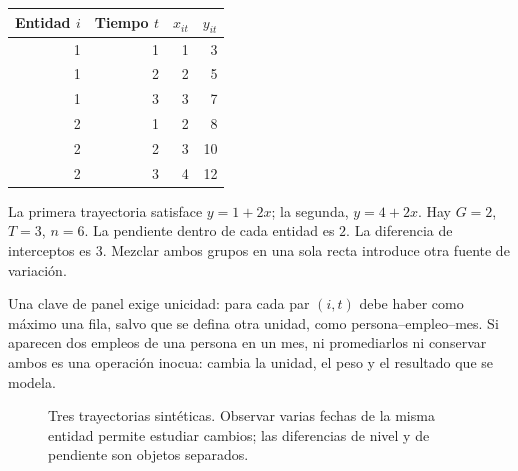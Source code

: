 \documentclass[11pt,a4paper]{article}
\theoremstyle{definition}
\begin{document}
\begin{ejemplo}
\begin{center}
\begin{tabular}{rrrr}
\toprule
Entidad $i$ & Tiempo $t$ & $x_{it}$ & $y_{it}$\\
\midrule
1&1&1&3\\1&2&2&5\\1&3&3&7\\
2&1&2&8\\2&2&3&10\\2&3&4&12\\
\bottomrule
\end{tabular}
\end{center}
La primera trayectoria satisface $y=1+2x$; la segunda, $y=4+2x$. Hay $G=2$, $T=3$, $n=6$. La pendiente dentro de cada entidad es $2$. La diferencia de interceptos es $3$. Mezclar ambos grupos en una sola recta introduce otra fuente de variación.
\end{ejemplo}
Una clave de panel exige unicidad: para cada par $(i,t)$ debe haber como máximo una fila, salvo que se defina otra unidad, como persona--empleo--mes. Si aparecen dos empleos de una persona en un mes, ni promediarlos ni conservar ambos es una operación inocua: cambia la unidad, el peso y el resultado que se modela.



\begin{figure}[htbp]\centering
{}
\caption{Tres trayectorias sintéticas. Observar varias fechas de la misma entidad permite estudiar cambios; las diferencias de nivel y de pendiente son objetos separados.}\label{fig:panel-1}
\end{figure}
\end{document}

